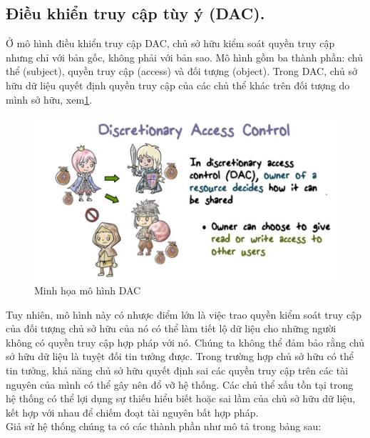 \subsection{Điều khiển truy cập tùy ý (DAC).}
Ở mô hình điều khiển truy cập DAC, chủ sở hữu kiểm soát quyền truy cập nhưng
chỉ với bản gốc, không phải với bản sao. Mô hình gồm ba thành phần: chủ thể (subject),
quyền truy cập (access) và đối tượng (object). Trong DAC, chủ sở hữu dữ liệu quyết
định quyền truy cập của các chủ thể khác trên đối tượng do mình sở hữu, xem\ref{fig:chap2-dac}. \\
\begin{figure}
    \centering
    \includegraphics[scale=0.5]{graphics/chapter-2/chap2-dac.png}
    \caption{Minh họa mô hình DAC}
    \label{fig:chap2-dac}
\end{figure}
\indent Tuy nhiên, mô hình này có nhược điểm lớn là việc trao quyền kiểm soát truy cập
của đối tượng chủ sở hữu của nó có thể làm tiết lộ dữ liệu cho những người không có
quyền truy cập hợp pháp với nó. Chúng ta không thể đảm bảo rằng chủ sở hữu dữ liệu
là tuyệt đối tin tưởng được. Trong trường hợp chủ sở hữu có thể tin tưởng, khả năng chủ
sở hữu quyết định sai các quyền truy cập trên các tài nguyên của mình có thể gây nên đổ
vỡ hệ thống. Các chủ thể xấu tồn tại trong hệ thống có thể lợi dụng sự thiếu hiểu biết hoặc sai lầm của chủ sở hữu dữ liệu, kết hợp với nhau để chiếm đoạt tài nguyên bất hợp
pháp. \\
Giả sử hệ thống chúng ta có các thành phần như mô tả trong bảng sau: \\

